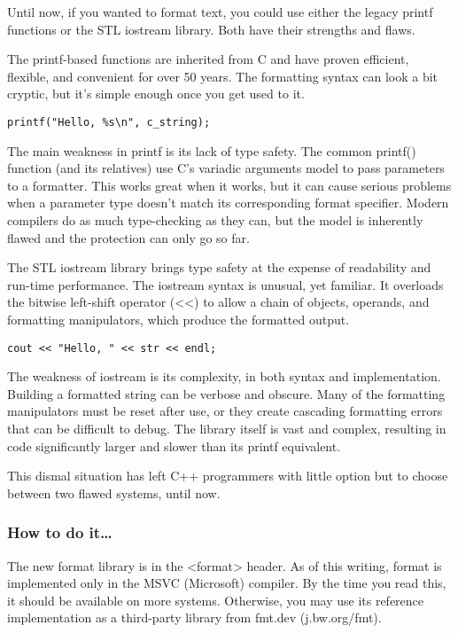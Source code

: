 
Until now, if you wanted to format text, you could use either the legacy printf functions or the STL iostream library. Both have their strengths and flaws.

The printf-based functions are inherited from C and have proven efficient, flexible, and convenient for over 50 years. The formatting syntax can look a bit cryptic, but it's simple enough once you get used to it.

\begin{lstlisting}[style=styleCXX]
printf("Hello, %s\n", c_string);
\end{lstlisting}

The main weakness in printf is its lack of type safety. The common printf() function (and its relatives) use C's variadic arguments model to pass parameters to a formatter. This works great when it works, but it can cause serious problems when a parameter type doesn't match its corresponding format specifier. Modern compilers do as much type-checking as they can, but the model is inherently flawed and the protection can only go so far.

The STL iostream library brings type safety at the expense of readability and run-time performance. The iostream syntax is unusual, yet familiar. It overloads the bitwise left-shift operator (<<) to allow a chain of objects, operands, and formatting manipulators, which produce the formatted output.

\begin{lstlisting}[style=styleCXX]
cout << "Hello, " << str << endl;
\end{lstlisting}

The weakness of iostream is its complexity, in both syntax and implementation. Building a formatted string can be verbose and obscure. Many of the formatting manipulators must be reset after use, or they create cascading formatting errors that can be difficult to debug. The library itself is vast and complex, resulting in code significantly larger and slower than its printf equivalent.

This dismal situation has left C++ programmers with little option but to choose between two flawed systems, until now.

\subsubsection{How to do it…}

The new format library is in the <format> header. As of this writing, format is implemented only in the MSVC (Microsoft) compiler. By the time you read this, it should be available on more systems. Otherwise, you may use its reference implementation as a third-party library from fmt.dev (j.bw.org/fmt).

